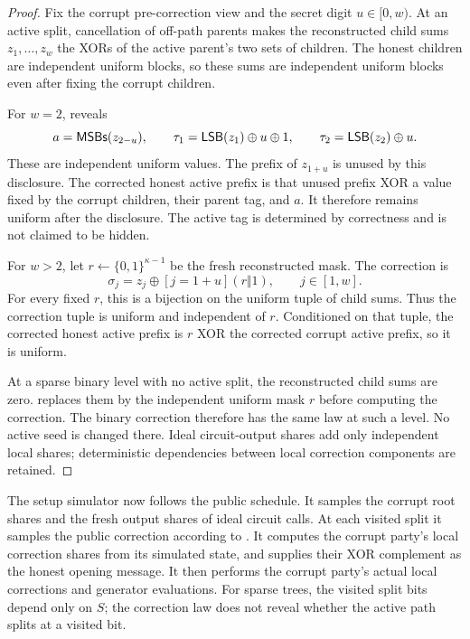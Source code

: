 \begin{proof}
Fix the corrupt pre-correction view and the secret digit $u\in[0,w)$.
At an active split, cancellation of off-path parents makes the reconstructed
child sums $z_1,\ldots,z_w$ the XORs of the active parent's two sets of
children. The honest children are independent uniform blocks, so these sums
are independent uniform blocks even after fixing the corrupt children.

For $w=2$,  reveals
\[
 a=\mathsf{MSBs}(z_{2-u}),\qquad
 \tau_1=\mathsf{LSB}(z_1)\oplus u\oplus1,\qquad
 \tau_2=\mathsf{LSB}(z_2)\oplus u.
\]
These are independent uniform values. The prefix of $z_{1+u}$ is unused
by this disclosure. The corrected honest active prefix is that unused
prefix XOR a value fixed by the corrupt children, their parent tag, and
$a$. It therefore remains uniform after the disclosure. The active tag is
determined by correctness and is not claimed to be hidden.

For $w>2$, let $r\gets\{0,1\}^{\kappa-1}$ be the fresh reconstructed mask.
The correction is
\[
 \sigma_j=z_j\oplus[j=1+u](r\Vert1),\qquad j\in[1,w].
\]
For every fixed $r$, this is a bijection on the uniform tuple of child
sums. Thus the correction tuple is uniform and independent of $r$.
Conditioned on that tuple, the corrected honest active prefix is $r$ XOR
the corrected corrupt active prefix, so it is uniform.

At a sparse binary level with no active split, the reconstructed child sums
are zero.  replaces them by the independent uniform
mask $r$ before computing the correction. The binary correction therefore
has the same law at such a level. No active seed is changed there. Ideal
circuit-output shares add only independent local shares; deterministic
dependencies between local correction components are retained.
\end{proof}

The setup simulator now follows the public schedule. It samples the corrupt
root shares and the fresh output shares of ideal circuit calls. At each
visited split it samples the public correction according to
. It computes the corrupt party's
local correction shares from its simulated state, and supplies their XOR
complement as the honest opening message. It then performs the corrupt
party's actual local corrections and generator evaluations. For sparse
trees, the visited split bits depend only on $S$; the correction law does
not reveal whether the active path splits at a visited bit.

